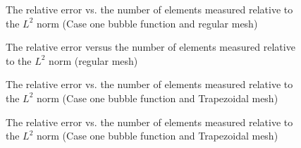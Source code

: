 \documentclass[preprint,12pt,authoryear]{elsarticle}
\begin{document}
\begin{figure}[h!]
\begin{center}
\caption{The relative error vs. the number of elements measured relative 
to the $L^{2}$ norm (Case one bubble function and regular mesh)}
\end{center}
\end{figure}
%
\begin{figure}[h!]
\begin{center}
\caption{The relative error versus the number of elements measured relative to the $L^{2}$ norm (regular mesh)}
\end{center}
\end{figure}
\begin{figure}[h!]
\begin{center}
\caption{The relative error vs. the number of elements measured relative 
to the $L^{2}$ norm (Case one bubble function and Trapezoidal mesh)}
\end{center}
\end{figure}
%
\begin{figure}[h!]
\begin{center}
\caption{The relative error vs. the number of elements measured relative 
to the $L^{2}$ norm (Case one bubble function and Trapezoidal mesh)}
\end{center}
\end{figure}
%
\end{document}
